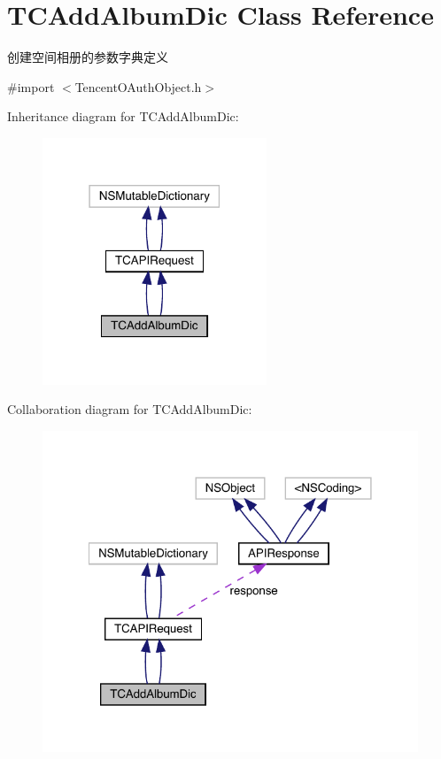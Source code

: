 \hypertarget{interface_t_c_add_album_dic}{}\section{T\+C\+Add\+Album\+Dic Class Reference}
\label{interface_t_c_add_album_dic}


创建空间相册的参数字典定义  




{\ttfamily \#import $<$Tencent\+O\+Auth\+Object.\+h$>$}



Inheritance diagram for T\+C\+Add\+Album\+Dic\+:\nopagebreak
\begin{figure}[H]
\begin{center}
\leavevmode
\includegraphics[width=190pt]{interface_t_c_add_album_dic__inherit__graph}
\end{center}
\end{figure}


Collaboration diagram for T\+C\+Add\+Album\+Dic\+:\nopagebreak
\begin{figure}[H]
\begin{center}
\leavevmode
\includegraphics[width=322pt]{interface_t_c_add_album_dic__coll__graph}
\end{center}
\end{figure}
